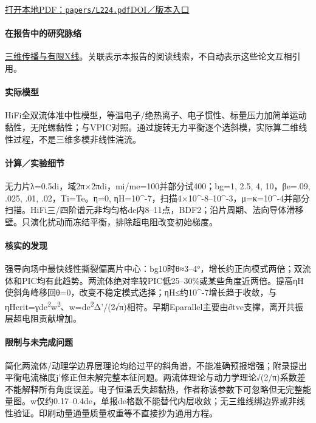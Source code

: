 \documentclass[UTF8,a4paper,11pt,openany,fontset=fandol]{ctexbook}
\begin{document}
\href{run:../papers/L224.pdf}{打开本地PDF：\texttt{papers/L224.pdf}}\quad\href{https://doi.org/10.1063/1.4940945}{DOI／版本入口}

\paragraph{在报告中的研究脉络}\hyperref[story:three]{三维传播与有限X线}。关联表示本报告的阅读线索，不自动表示这些论文互相引用。

\paragraph{实际模型}HiFi全双流体准中性模型，等温电子/绝热离子、电子惯性、标量压力加简单运动黏性，无陀螺黏性；与VPIC对照。通过旋转无力平衡逐个选斜模，实际算二维线性过程，不是三维多模非线性湍流。

\paragraph{计算／实验细节}无力片λ=0.5di，域2π×2πdi，mi/me=100并部分试400；bg=1, 2.5, 4, 10，βe=.09, .025, .01, .02，Ti=Te。η=0, ηH=10\textasciicircum{}-7，扫描4×10\textasciicircum{}-8–10\textasciicircum{}-3，μ=κ=10\textasciicircum{}-4并部分扫描。HiFi三/四阶谱元非均匀格de内8–11点，BDF2；沿片周期、法向导体滑移壁。只演化扰动而冻结平衡，排除超电阻改变初始梯度。

\paragraph{核实的发现}强导向场中最快线性撕裂偏离片中心：bg10时θ≈3–4°，增长约正向模式两倍；双流体和PIC均有此趋势。两流体绝对率较PIC低25–30\%或某些角度近两倍。提高ηH使斜角峰移回θ=0，改变不稳定模式选择；ηH≤约10\textasciicircum{}-7增长趋于收敛，与ηHcrit=γde\textsuperscript{2}w\textsuperscript{2}、w=de\textsuperscript{2}Δ'/(2√π)相符。早期Eparallel主要由∂tve支撑，离开共振层超电阻贡献增加。

\paragraph{限制与未完成问题}简化两流体/动理学边界层理论均给过平的斜角谱，不能准确预报增强；附录提出平衡电流梯度j'修正但未解完整本征问题。两流体理论与动力学理论√(2/π)系数差不能解释所有角度误差。电子恒温丢失超黏热，作者称该参数下可忽略但无完整能量图。w仅约0.17–0.4de，单报de格数不能替代内层收敛；无三维线绑边界或非线性验证。印刷动量通量质量权重等不直接抄为通用方程。
\end{document}

